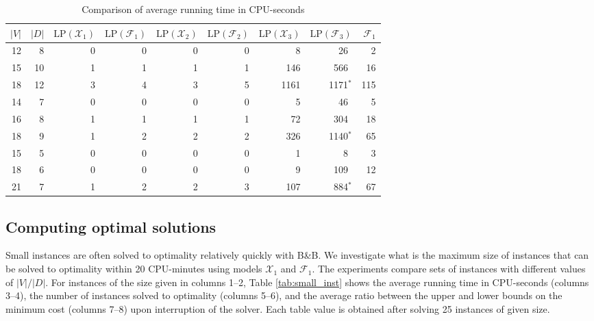 \begin{table}[h!]
\centering
\setlength{\tabcolsep}{6pt} %
\renewcommand{\arraystretch}{1.4} %
\begin{tabular}{rrrrrrrrr}
 $|V|$ & $|D|$ & $\text{LP}(\mathcal{X}_1)$ & $\text{LP}(\mathcal{F}_1)$ & $\text{LP}(\mathcal{X}_2)$ & $\text{LP}(\mathcal{F}_2)$ & $\text{LP}(\mathcal{X}_3)$ & $\text{LP}(\mathcal{F}_3)$ & $\mathcal{F}_1$\\ \hline
  12 & 8       & 0   & 0   & 0     & 0     & 8    & 26\textcolor{white}{$^*$}   & 2   \\
  15 & 10      & 1   & 1   & 1     & 1     & 146  & 566\textcolor{white}{$^*$}  & 16  \\
  18 & 12      & 3   & 4   & 3     & 5     & 1161 & 1171$^*$                    & 115 \\\hline
  14 & 7       & 0   & 0   & 0     & 0     & 5    & 46\textcolor{white}{$^*$}   & 5   \\ 
  16 & 8       & 1   & 1   & 1     & 1     & 72   & 304\textcolor{white}{$^*$}  & 18  \\
  18 & 9       & 1   & 2   & 2     & 2     & 326  & 1140$^*$                    & 65  \\ \hline
  15 & 5       & 0   & 0   & 0     & 0     & 1    & 8\textcolor{white}{$^*$}    & 3   \\ 
  18 & 6       & 0   & 0   & 0     & 0     & 9    & 109\textcolor{white}{$^*$}  & 12  \\ 
  21 & 7       & 1   & 2   & 2     & 3     & 107  & 884$^*$                     & 67
\end{tabular}
\caption{Comparison of average running time in CPU-seconds}
\label{tab:small_inst_time}
\end{table}

\subsection{Computing optimal solutions}
\label{sec:expsmall}

Small instances are often solved to optimality relatively quickly with B\&B.
We investigate what is the maximum size of instances that can be solved to optimality within 20 CPU-minutes using models $\mathcal{X}_1$ and $\mathcal{F}_1$.
The experiments compare sets of instances with different values of $|V|/|D|$.
For instances of the size given in columns 1--2, Table \ref{tab:small_inst} shows the average running time in CPU-seconds (columns 3--4),
the number of instances solved to optimality (columns 5--6),
and the average ratio between the upper and lower bounds on the minimum cost (columns 7--8) upon interruption of the solver.
Each table value is obtained after solving 25 instances of given size.


